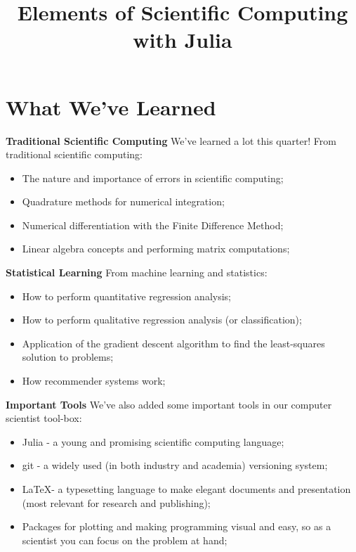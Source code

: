 \documentclass[xcolor=dvipsnames]{beamer}
\title[Scientific Computing]{Elements of Scientific Computing with Julia}
\begin{document}
\begin{frame}
\titlepage
\end{frame}

\section{What We've Learned}
\begin{frame}
{\bf Traditional Scientific Computing}
We've learned a lot this quarter! From traditional scientific computing: \pause
\begin{itemize}
\item The nature and importance of errors in scientific computing;\pause
\item Quadrature methods for numerical integration;\pause
\item Numerical differentiation with the Finite Difference Method;\pause
\item Linear algebra concepts and performing matrix computations;
\end{itemize}
\end{frame}

\begin{frame}
{\bf Statistical Learning}
From machine learning and statistics: \pause
\begin{itemize}
\item How to perform quantitative regression analysis;\pause
\item How to perform qualitative regression analysis (or classification);\pause
\item Application of the gradient descent algorithm to find the least-squares solution to problems;\pause
\item How recommender systems work;
\end{itemize}
\end{frame}

\begin{frame}
{\bf Important Tools}
We've also added some important tools in our computer scientist tool-box: \pause
\begin{itemize}
\item Julia - a young and promising scientific computing language;\pause
\item git - a widely used (in both industry and academia) versioning system;\pause
\item \LaTeX - a typesetting language to make elegant documents and presentation (most relevant for research and publishing);\pause
\item Packages for plotting and making programming visual and easy, so as a scientist you can focus on the problem at hand;
\end{itemize}
\end{frame}
\end{document}
